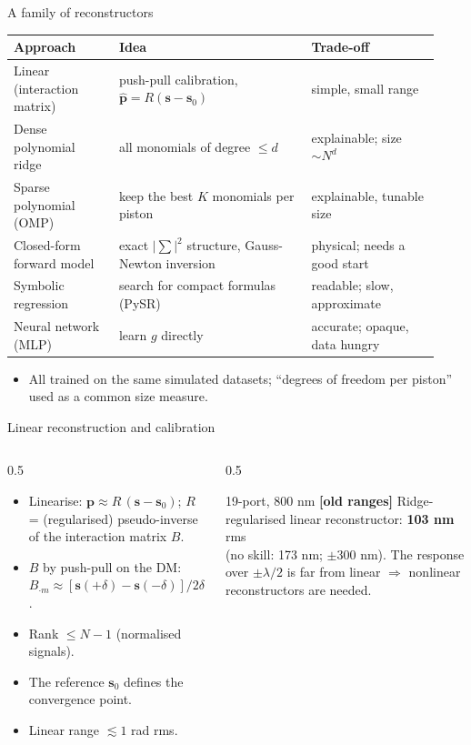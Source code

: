 \documentclass[aspectratio=169,10pt]{beamer}
\newcommand{\oldrange}{\textcolor{orange!90!black}{\textbf{[old ranges]}}}
\begin{document}
\begin{frame}{A family of reconstructors}
\small
\begin{tabular}{@{}p{0.23\linewidth}p{0.42\linewidth}p{0.28\linewidth}@{}}
\toprule
\textbf{Approach} & \textbf{Idea} & \textbf{Trade-off} \\
\midrule
Linear (interaction matrix) & push-pull calibration, $\hat{\mathbf p} = R(\mathbf s - \mathbf s_0)$ & simple, small range \\
Dense polynomial ridge & all monomials of degree $\le d$ & explainable; size $\sim N^d$ \\
Sparse polynomial (OMP) & keep the best $K$ monomials per piston & explainable, tunable size \\
Closed-form forward model & exact $|\!\sum\!|^2$ structure, Gauss-Newton inversion & physical; needs a good start \\
Symbolic regression & search for compact formulas (PySR) & readable; slow, approximate \\
Neural network (MLP) & learn $g$ directly & accurate; opaque, data hungry \\
\bottomrule
\end{tabular}
\vspace{4pt}
\begin{itemize}
    \item All trained on the same simulated datasets; ``degrees of freedom per piston''
          used as a common size measure.
\end{itemize}
\end{frame}

\begin{frame}{Linear reconstruction and calibration}
\begin{columns}[T]
\begin{column}{0.5\textwidth}
\small
\begin{itemize}
    \item Linearise: $\mathbf p \approx R\,(\mathbf s - \mathbf s_0)$; $R$ = (regularised)
          pseudo-inverse of the interaction matrix $B$.
    \item $B$ by push-pull on the DM:
          $B_{\cdot m} \approx [\mathbf s(+\delta) - \mathbf s(-\delta)]/2\delta$.
    \item Rank $\le N - 1$ (normalised signals).
    \item The reference $\mathbf s_0$ defines the convergence point.
    \item Linear range $\lesssim 1$ rad rms.
\end{itemize}
\end{column}
\begin{column}{0.5\textwidth}
\small
\begin{block}{19-port, 800 nm \oldrange}
Ridge-regularised linear reconstructor: \textbf{103 nm} rms\\
(no skill: 173 nm; $\pm300$ nm). The response over $\pm\lambda/2$ is far from linear $\Rightarrow$ nonlinear
reconstructors are needed.
\end{block}
\end{column}
\end{columns}
\end{frame}
\end{document}
